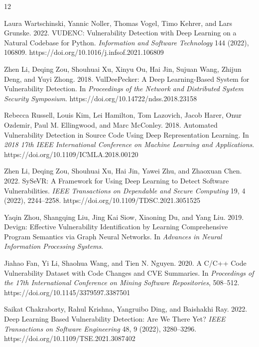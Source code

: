 \begin{thebibliography}{12}

Laura Wartschinski, Yannic Noller, Thomas Vogel, Timo Kehrer, and Lars Grunske.
2022.
\newblock VUDENC: Vulnerability Detection with Deep Learning on a Natural Codebase for Python.
\newblock \emph{Information and Software Technology} 144 (2022), 106809.
\newblock https://doi.org/10.1016/j.infsof.2021.106809

Zhen Li, Deqing Zou, Shouhuai Xu, Xinyu Ou, Hai Jin, Sujuan Wang, Zhijun Deng, and Yuyi Zhong.
2018.
\newblock VulDeePecker: A Deep Learning-Based System for Vulnerability Detection.
\newblock In \emph{Proceedings of the Network and Distributed System Security Symposium}.
\newblock https://doi.org/10.14722/ndss.2018.23158

Rebecca Russell, Louis Kim, Lei Hamilton, Tom Lazovich, Jacob Harer, Onur Ozdemir, Paul M. Ellingwood, and Marc McConley.
2018.
\newblock Automated Vulnerability Detection in Source Code Using Deep Representation Learning.
\newblock In \emph{2018 17th IEEE International Conference on Machine Learning and Applications}.
\newblock https://doi.org/10.1109/ICMLA.2018.00120

Zhen Li, Deqing Zou, Shouhuai Xu, Hai Jin, Yawei Zhu, and Zhaoxuan Chen.
2022.
\newblock SySeVR: A Framework for Using Deep Learning to Detect Software Vulnerabilities.
\newblock \emph{IEEE Transactions on Dependable and Secure Computing} 19, 4 (2022), 2244--2258.
\newblock https://doi.org/10.1109/TDSC.2021.3051525

Yaqin Zhou, Shangqing Liu, Jing Kai Siow, Xiaoning Du, and Yang Liu.
2019.
\newblock Devign: Effective Vulnerability Identification by Learning Comprehensive Program Semantics via Graph Neural Networks.
\newblock In \emph{Advances in Neural Information Processing Systems}.

Jiahao Fan, Yi Li, Shaohua Wang, and Tien N. Nguyen.
2020.
\newblock A C/C++ Code Vulnerability Dataset with Code Changes and CVE Summaries.
\newblock In \emph{Proceedings of the 17th International Conference on Mining Software Repositories}, 508--512.
\newblock https://doi.org/10.1145/3379597.3387501

Saikat Chakraborty, Rahul Krishna, Yangruibo Ding, and Baishakhi Ray.
2022.
\newblock Deep Learning Based Vulnerability Detection: Are We There Yet?
\newblock \emph{IEEE Transactions on Software Engineering} 48, 9 (2022), 3280--3296.
\newblock https://doi.org/10.1109/TSE.2021.3087402


\end{thebibliography}
